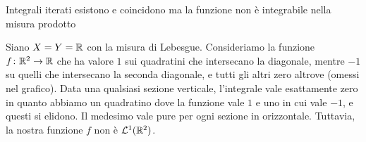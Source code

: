 \documentclass[a4paper]{article}
\begin{document}
\begin{radioactive}
\begin{snippetexample}{Integrali iterati esistono e coincidono ma la funzione non è integrabile nella misura prodotto}
    \begin{figure}
        \begin{center}
            \vspace{-1cm}
        \end{center}
    \end{figure}
    Siano \(X = Y = \mathbb{R}\) con la misura di Lebesgue.
    Consideriamo la funzione \(f \colon \mathbb{R}^2 \to \mathbb{R}\) che ha valore \(1\)
    sui quadratini che intersecano la diagonale, mentre \(-1\)
    su quelli che intersecano la seconda diagonale, e tutti gli altri zero altrove
    (omessi nel grafico). Data una qualsiasi sezione verticale, l'integrale vale esattamente
    zero in quanto abbiamo un quadratino dove la funzione vale \(1\) e uno in cui vale \(-1\), e questi
    si elidono. Il medesimo vale pure per ogni sezione in orizzontale.
    Tuttavia, la nostra funzione \(f\) non è \(\mathcal L^1(\mathbb{R}^2)\).
    \wrapfill
\end{snippetexample}
\end{radioactive}
\end{document}

